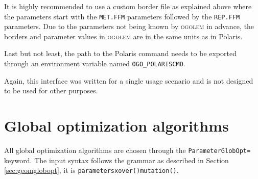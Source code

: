 \documentclass[a4paper,10pt]{scrbook}
\newcommand{\ogo}{\textsc{ogolem}}
\begin{document}
It is highly recommended to use a custom border file as explained above where
the parameters start with the \texttt{MET.FFM} parameters followed by the
\texttt{REP.FFM} parameters. Due to the parameters not being known by \ogo{} in
advance, the borders and parameter values in \ogo{} are in the same units as in
Polaris.

Last but not least, the path to the Polaris command needs to be exported
through an environment variable named \texttt{OGO\_POLARISCMD}.

Again, this interface was written for a single usage scenario and is not
designed to be used for other purposes.

\section{Global optimization algorithms}
All global optimization algorithms are chosen through the
\texttt{ParameterGlobOpt=} keyword. The input syntax follows the grammar as 
described in Section \ref{sec:geomglobopt}, it is 
\texttt{parameters{xover()mutation()}}.
\end{document}
